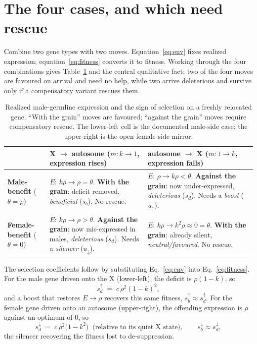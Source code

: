 \documentclass[11pt,a4paper]{article}
\begin{document}
\section{The four cases, and which need rescue}

Combine two gene types with two moves. Equation~\eqref{eq:env} fixes realized expression; equation~\eqref{eq:fitness} converts it to fitness. Working through the four combinations gives Table~\ref{tab:fourcells} and the central qualitative fact: two of the four moves are favoured on arrival and need no help, while two arrive deleterious and survive only if a compensatory variant rescues them.

\begin{table}[h!]
\centering
\small
\caption{Realized male-germline expression and the sign of selection on a freshly relocated gene. ``With the grain'' moves are favoured; ``against the grain'' moves require compensatory rescue. The lower-left cell is the documented male-side case; the upper-right is the open female-side mirror.}
\label{tab:fourcells}
\begin{tabular}{p{2.6cm} p{5.4cm} p{5.4cm}}
\toprule
 & \textbf{X $\to$ autosome} ($m:k\to1$, expression rises) & \textbf{autosome $\to$ X} ($m:1\to k$, expression falls) \\
\midrule
\textbf{Male-benefit} ($\theta=\rho$) & $E:\,k\rho\to\rho=\theta$. \textbf{With the grain}: deficit removed, \emph{beneficial} ($s_b$). No rescue. & $E:\,\rho\to k\rho<\theta$. \textbf{Against the grain}: now under-expressed, \emph{deleterious} ($s_d$). Needs a \emph{boost} ($u_{\uparrow}$). \\
\addlinespace
\textbf{Female-benefit} ($\theta=0$) & $E:\,k\rho\to\rho>\theta$. \textbf{Against the grain}: now mis-expressed in males, \emph{deleterious} ($s_d$). Needs a \emph{silencer} ($u_{\downarrow}$). & $E:\,k\rho\to k^2\rho\approx 0=\theta$. \textbf{With the grain}: already silent, \emph{neutral/favoured}. No rescue. \\
\bottomrule
\end{tabular}
\end{table}

The selection coefficients follow by substituting Eq.~\eqref{eq:env} into Eq.~\eqref{eq:fitness}. For the male gene driven onto the X (lower-left), the deficit is $\rho(1-k)$, so
\begin{equation}
s_d^{\uparrow} \;=\; c\,\rho^2(1-k)^2,
\label{eq:sdm}
\end{equation}
and a boost that restores $E\to\rho$ recovers this same fitness, $s_b^{\uparrow}\approx s_d^{\uparrow}$. For the female gene driven onto an autosome (upper-right), the offending expression is $\rho$ against an optimum of $0$, so
\begin{equation}
s_d^{\downarrow} \;=\; c\,\rho^2\big(1-k^2\big) \;\; \text{(relative to its quiet X state)}, \qquad s_b^{\downarrow}\approx s_d^{\downarrow},
\label{eq:sdf}
\end{equation}
the silencer recovering the fitness lost to de-suppression.
\end{document}
